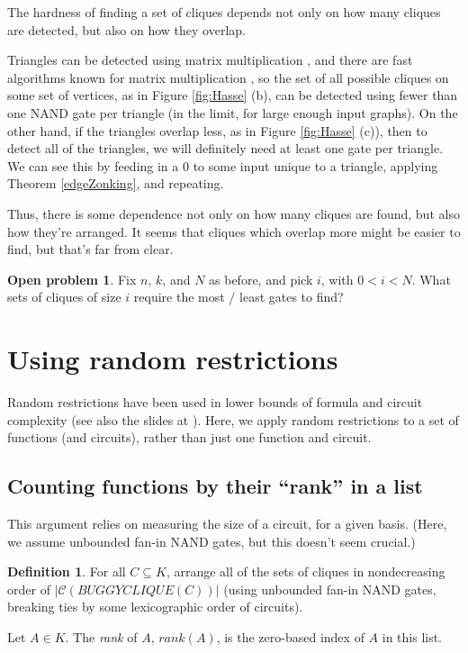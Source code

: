 \documentclass[12pt]{article}
\theoremstyle{definition}
\newtheorem{defn}{Definition}[section]
\newtheorem{prob}{Open problem}[section]
\newcommand{\bigC}[0]{\mathcal{C}}
\begin{document}
The hardness of finding a set of cliques
depends not only on how many cliques are detected,
but also on how they overlap.

Triangles can be detected using matrix multiplication \cite{itai_finding_1977},
and there are fast algorithms known for matrix multiplication
\cite{strassen_gaussian_1969}
\cite{williams_multiplying_2012}, so the set of all possible
cliques on some set of vertices, as in
Figure \ref{fig:Hasse} (b),
 can be detected
using fewer than one NAND gate per triangle (in the limit,
for large enough input graphs).
On the other hand, if the triangles overlap less, as in
Figure \ref{fig:Hasse} (c)),
then to detect all of the triangles, we will definitely need at least one
gate per triangle. We can see this by feeding in a 0 to some input
unique to a triangle, applying Theorem \ref{edgeZonking}, and repeating.

Thus, there is some dependence not only on how many cliques are found, but
also how they're arranged. It seems that cliques which overlap more might
be easier to find, but that's far from clear.

\begin{prob}
\label{overlapEffect}
Fix $n$, $k$, and $N$ as before, and pick $i$, with
$0 < i < N$. What sets of cliques of size $i$
require the most / least gates to find?
\end{prob}

\section{Using random restrictions}

Random restrictions have been used in lower bounds of formula
\cite{subbotovskaya1963comparison} and circuit \cite{hastad1987lower}
complexity (see also the slides at \cite{rossmanRestrictions}).
Here, we apply random restrictions to a set of functions (and circuits),
rather than just one function and circuit.

\subsection{Counting functions by their ``rank'' in a list}

This argument relies on measuring the size of a circuit,
for a given basis. (Here, we assume unbounded fan-in
NAND gates, but this doesn't seem crucial.)

\begin{defn}
\label{Rank}
For all $C \subseteq K$,
arrange all of the sets of cliques in nondecreasing order
of $|\bigC(BUGGYCLIQUE(C))|$ (using unbounded fan-in NAND gates,
breaking ties by some lexicographic order of circuits).

Let $A \in K$. The {\em rank} of $A$, $rank(A)$, is the zero-based
index of $A$ in this list.
\end{defn}
\end{document}

